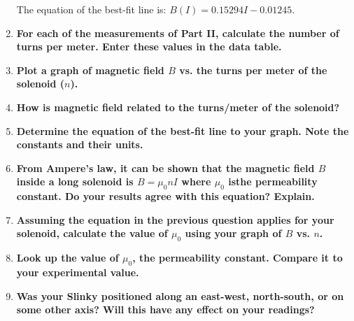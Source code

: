 \documentclass[article, 12pt]{article}
\begin{document}
\begin{enumerate}[1.]
         The equation of the best-fit line is: $B(I) = 0.15294I - 0.01245$.
         \item \textbf{For each of the measurements of Part II, calculate the number of turns per meter. Enter these
         values in the data table.}
         \item \textbf{Plot a graph of magnetic field $B$ vs. the turns per meter of the solenoid ($n$).}
         \item \textbf{How is magnetic field related to the turns/meter of the solenoid?}
         \item \textbf{Determine the equation of the best-fit line to your graph. Note the constants and their units.}
         \item \textbf{From Ampere's law, it can be shown that the magnetic field $B$ inside a long solenoid
         is $B =\mu_0 n I$ where $\mu_0$ isthe permeability constant. Do your results agree with this equation? Explain.}
         \item \textbf{Assuming the equation in the previous question applies for your solenoid, calculate the value
         of $\mu_0$ using your graph of $B$ vs. $n$.}
         \item \textbf{Look up the value of $\mu_0$, the permeability constant. Compare it to your experimental value.}
         \item \textbf{Was your Slinky positioned along an east-west, north-south, or on some other axis? Will this
         have any effect on your readings?}
     \end{enumerate}
     
\end{document}
